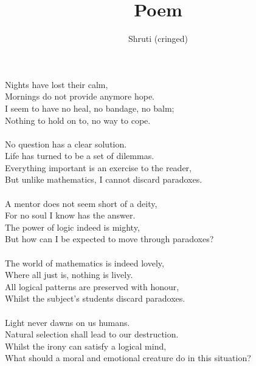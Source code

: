 \documentclass{article}
\title{Poem}
\author{Shruti (cringed)}
\begin{document}
\maketitle
Nights have lost their calm,
\\Mornings do not provide anymore hope.
\\I seem to have no heal, no bandage, no balm;
\\Nothing to hold on to, no way to cope.
\\
\\No question has a clear solution.
\\Life has turned to be a set of dilemmas.
\\Everything important is an exercise to the reader,
\\But unlike mathematics, I cannot discard paradoxes.
\\
\\A mentor does not seem short of a deity,
\\For no soul I know has the answer.
\\The power of logic indeed is mighty,
\\But how can I be expected to move through paradoxes?
\\
\\The world of mathematics is indeed lovely,
\\Where all just is, nothing is lively.
\\All logical patterns are preserved with honour,
\\Whilst the subject's students discard paradoxes.
\\
\\Light never dawns on us humans.
\\Natural selection shall lead to our destruction.
\\Whilst the irony can satisfy a logical mind,
\\What should a moral and emotional creature do in this situation?
\end{document}
